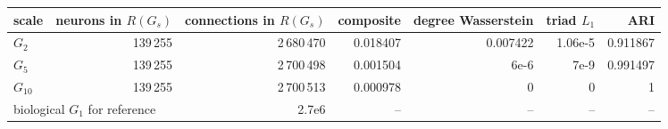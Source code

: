 {\small\setlength{\tabcolsep}{3pt}
\begin{tabular}{l r r r r r r}
\toprule
scale & neurons in $R(G_s)$ & connections in $R(G_s)$ & composite & degree Wasserstein & triad $L_1$ & ARI \\
\midrule
$G_{2}$ & 139\,255 & 2\,680\,470 & 0.018407 & 0.007422 & 1.06e-5 & 0.911867 \\
$G_{5}$ & 139\,255 & 2\,700\,498 & 0.001504 & 6e-6 & 7e-9 & 0.991497 \\
$G_{10}$ & 139\,255 & 2\,700\,513 & 0.000978 & 0 & 0 & 1 \\
\midrule
\multicolumn{2}{l}{biological $G_1$ for reference} & 2.7e6 & -- & -- & -- & -- \\
\bottomrule
\end{tabular}

}
